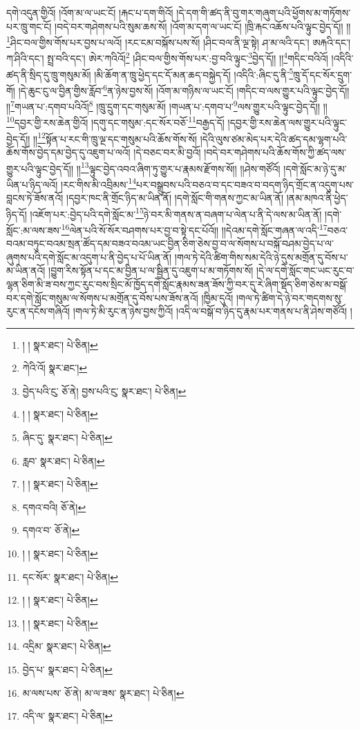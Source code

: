 དགེ་འདུན་གྱིའོ། །འོག་མ་ལ་ཡང་ངོ། །རྐང་པ་དག་གིའོ། །དེ་དག་གི་ཚད་ནི་བུ་གར་གཞུག་པའི་ཕྱོགས་མ་གཏོགས་པར་ཁྲུ་གང་ངོ། །བདེ་བར་གཤེགས་པའི་སུམ་ཆས་སོ། །འོག་མ་དག་ལ་ཡང་ངོ། །ཁྲི་རྐང་འཆོས་པའི་ལྟུང་བྱེད་དོ།། །།\footnote{། །  སྣར་ཐང་།  པེ་ཅིན། }ཤིང་བལ་གྱིས་གོས་པར་བྱས་པ་ལའོ། །རང་ངམ་བསྐོས་པས་སོ། །ཤིང་བལ་ནི་ལྔ་སྟེ། ཤ་མ་ལའི་དང་། ཨརྐའི་དང་། ཀ་ཤིའི་དང་། སྤྲ་བའི་དང་། ཨེར་ཀའིའོ།\footnote{ཀེའི་འོ།  སྣར་ཐང་། } །ཤིང་བལ་གྱིས་གོས་པར་:བྱ་བའི་ལྟུང་\footnote{བྱེད་པའི་ུང་  ཅོ་ནེ། བྱས་པའི་ུང་  སྣར་ཐང་།  པེ་ཅིན། }བྱེད་དོ།། །།\footnote{། །  སྣར་ཐང་།  པེ་ཅིན། }གདིང་བའིའོ། །འདིའི་ཚད་ནི་སྲིད་དུ་ཁྲུ་གསུམ་མོ། །མི་ཆོག་ན་ཁྲུ་ཕྱེད་དང་དོ་མན་ཆད་བསྐྱེད་དོ། །འདིའི་:ཞིང་དུ་ནི་\footnote{ཞིང་དུ་  སྣར་ཐང་།  པེ་ཅིན། }ཁྲུ་དོ་དང་སོར་དྲུག་གོ། །དེ་ཆུང་ངུ་ལ་བྱིན་གྱིས་རློབ་\footnote{རླབ་  སྣར་ཐང་།  པེ་ཅིན། }ན་ཉེས་བྱས་སོ། །འོག་མ་གཉིས་ལ་ཡང་ངོ། །གདིང་བ་ལས་གྱུར་པའི་ལྟུང་བྱེད་དོ།། །།\footnote{། །  སྣར་ཐང་།  པེ་ཅིན། }གཡན་པ་:དགབ་པའིའོ།\footnote{དགའ་བའི།  ཅོ་ནེ། } །ཁྲུ་དྲུག་དང་གསུམ་མོ། །གཡན་པ་:དགབ་པ་\footnote{དགའ་བ་  ཅོ་ནེ། }ལས་གྱུར་པའི་ལྟུང་བྱེད་དོ།། །།\footnote{། །  སྣར་ཐང་།  པེ་ཅིན། }དབྱར་གྱི་རས་ཆེན་གྱིའོ། །དགུ་དང་གསུམ་:དང་སོར་བཅོ་\footnote{དང་སོར་  སྣར་ཐང་།  པེ་ཅིན། }བརྒྱད་དོ། །དབྱར་གྱི་རས་ཆེན་ལས་གྱུར་པའི་ལྟུང་བྱེད་དོ།། །།\footnote{། །  སྣར་ཐང་།  པེ་ཅིན། }སྟོན་པ་རང་གི་ཁྲུ་ལྔ་དང་གསུམ་པའི་ཆོས་གོས་སོ། །དེའི་ལུས་ཙམ་མེད་པར་དེའི་ཚད་དམ་ལྷག་པའི་ཆོས་གོས་བྱེད་དམ་བྱེད་དུ་འཇུག་པ་ལའོ། །དེ་བཅང་བར་མི་བྱའོ། །བདེ་བར་གཤེགས་པའི་ཆོས་གོས་ཀྱི་ཚད་ལས་གྱུར་པའི་ལྟུང་བྱེད་དོ།། །།\footnote{། །  སྣར་ཐང་།  པེ་ཅིན། }ལྟུང་བྱེད་འབའ་ཞིག་ཏུ་གྱུར་པ་རྣམས་རྫོགས་སོ།། །།ཤེས་གཙོའོ། །དགེ་སློང་མ་ཉེ་དུ་མ་ཡིན་པ་ཉིད་ལའོ། །རང་གིས་མི་འབྲིམས་\footnote{འདྲིམ་  སྣར་ཐང་།  པེ་ཅིན། }པར་བསྒྲུབས་པའི་བཅའ་བ་དང་བཟའ་བ་བདག་ཉིད་གྲོང་ན་འདུག་པས་བླངས་ཏེ་ཟོས་ནའོ། །དབྱར་ཁང་ནི་གྲོང་ཉིད་མ་ཡིན་ནོ། །དགེ་སློང་གི་གནས་ཀྱང་མ་ཡིན་ནོ། །ནམ་མཁའ་ནི་ཕྱེད་ཉིད་དོ། །འཇོག་པར་:བྱེད་པའི་དགེ་སློང་མ་\footnote{བྱེད་པ་  སྣར་ཐང་།  པེ་ཅིན། }ཉེ་བར་མི་གནས་ན་བཞག་པ་ལེན་པ་ནི་དེ་ལས་མ་ཡིན་ནོ། །དགེ་སློང་:མ་ལས་ཟས་\footnote{མ་ལས་པས་  ཅོ་ནེ། མ་ལ་ཟས་  སྣར་ཐང་།  པེ་ཅིན། }ལེན་པའི་སོ་སོར་བཤགས་པར་བྱ་བ་སྟེ་དང་པོའོ།། །།དེའམ་དགེ་སློང་གཞན་ལ་འདི་\footnote{འདི་ལ་  སྣར་ཐང་།  པེ་ཅིན། }བཅའ་བའམ་བཏུང་བའམ་སྲན་ཚོད་དམ་བཟའ་བའམ་ཡང་བྱིན་ཅིག་ཅེས་བྱ་བ་ལ་སོགས་པ་བསྐོ་བཤམ་བྱེད་པ་ལ་ཞུགས་པའི་དགེ་སློང་མ་འདུག་པ་ནི་བྱེད་པ་པོ་ཡིན་ནོ། །གལ་ཏེ་དེའི་ཚིག་གིས་སམ་དེའི་ཉེ་དུས་མགྲོན་དུ་བོས་པ་མ་ཡིན་ནའོ། །བྱུག་རིས་སྟོན་པ་དང་མ་བྱིན་པ་ལ་སྦྱིན་དུ་འཇུག་པ་མ་གཏོགས་སོ། །དེ་ལ་དགེ་སློང་གང་ཡང་རུང་བ་ལྷན་ཅིག་མི་ཟ་བས་ཀྱང་རུང་བས་སྲིང་མོ་ཁྱོད་དགེ་སློང་རྣམས་ཟན་ཟོས་ཀྱི་བར་དུ་རེ་ཞིག་སྡོད་ཅིག་ཅེས་མ་བསྒོ་བར་དགེ་སློང་གསུམ་ལ་སོགས་པ་མགྲོན་དུ་བོས་པས་ཟོས་ནའོ། །ཁྱིམ་དུའོ། །གལ་ཏེ་ཚིག་དེ་ཉེ་བར་གདགས་སུ་རུང་ན་དངོས་གཞིའོ། །གལ་ཏེ་མི་རུང་ན་ཉེས་བྱས་ཀྱིའོ། །འདི་ལ་བསྒོ་བ་ཉིད་དུ་རྣམ་པར་གནས་པ་ནི་ཤེས་གཙོའོ། །
